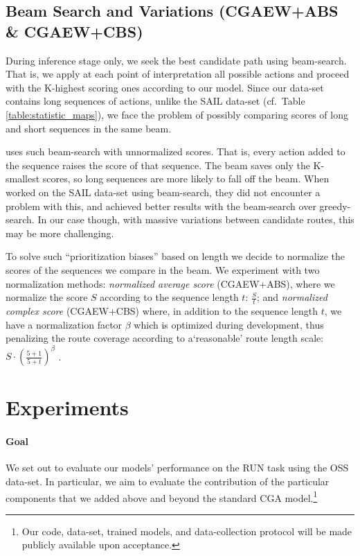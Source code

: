 \documentclass[11pt,a4paper]{article}
\begin{document}
\subsection{Beam Search and Variations (CGAEW+ABS \& CGAEW+CBS)}
During inference stage only, we seek the best candidate path using beam-search. That is, we apply at each point of interpretation all possible actions and proceed with the K-highest scoring ones according to our model.
Since our data-set contains long sequences of actions, unlike the SAIL data-set (cf.\ Table \ref{table:statistic_maps}), we face the problem of possibly comparing scores of long  and short sequences in the same beam.

\citet{mei2015listen} uses such beam-search with unnormalized scores. That is, every action added to the sequence raises the score of that sequence. The beam saves only the K-smallest scores, so long sequences are more likely to fall off the beam.
When \citet{mei2015listen} worked on the SAIL data-set using beam-search, they did not encounter a problem with this, and achieved better results with the beam-search over greedy-search. In our case though, with massive variations between candidate routes, this may be more challenging.

To solve such \enquote{prioritization biases} based on length  we decide to normalize the scores of the sequences we compare in the beam.  We experiment with two normalization methods: {\em normalized average score} (CGAEW+ABS), where we normalize the score $S$ according to the sequence length $t$:  \( \frac{S}{t} \); and {\em normalized complex score} (CGAEW+CBS) \citep{wu2016google} where, in addition to the sequence length $t$, we have a normalization factor $\beta$ which is optimized during development, thus penalizing the route coverage according to a\enquote*{reasonable} route length scale:  $S \cdot \left(\frac{5+1}{5+t}\right)^\beta$ . 



\section{Experiments}
\label{expirement}
\paragraph{Goal}We set out to evaluate our models' performance on the RUN task using the OSS data-set. In particular, we aim to evaluate the  contribution of the particular components that we added above and beyond the standard CGA model.\footnote{Our code, data-set, trained models, and data-collection protocol will be made publicly available upon acceptance.} 
\end{document}
